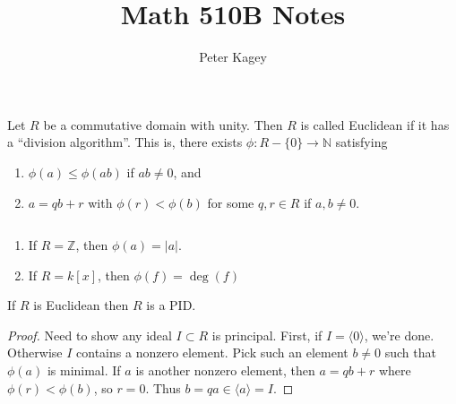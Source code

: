 \documentclass{article}
\newenvironment{definition}[1][Definition.]{
  \begin{trivlist} \item[\hskip \labelsep {\bfseries #1}]
}{\end{trivlist}}
\newenvironment{example}[1][Example.]{
  \begin{trivlist} \item[\hskip \labelsep {\bfseries #1}]
}{\end{trivlist}}
\newenvironment{theorem}[1][Theorem.]{
  \begin{trivlist} \item[\hskip \labelsep {\bfseries #1}]
}{\end{trivlist}}
\newcommand{\set}[1]{\{ #1 \}}
\newcommand{\ang}[1]{\langle #1 \rangle}
\newcommand{\fn}[3]{#1 \colon #2 \rightarrow #3}
\begin{document}
\title{Math 510B Notes}
\author{Peter Kagey}

\maketitle

\begin{definition}
  Let $R$ be a commutative domain with unity. Then $R$ is called Euclidean if it
  has a ``division algorithm''. This is, there exists
  $\fn{\phi}{R - \set 0}{\mathbb N}$ satisfying \begin{enumerate}
    \item $\phi(a) \leq \phi(ab)$ if $ab \neq 0$, and
    \item $a = qb + r$ with $\phi(r) < \phi(b)$ for some $q, r \in R$ if $a, b \neq 0$.
  \end{enumerate}
\end{definition}

\begin{example}[Examples.] $ $
  \begin{enumerate}
    \item If $R = \mathbb Z$, then $\phi(a) = |a|$.
    \item If $R = k[x]$, then $\phi(f) = \deg(f)$
  \end{enumerate}
\end{example}

\begin{theorem}[Lemma.]
  If $R$ is Euclidean then $R$ is a PID.
\end{theorem}
\begin{proof}
  Need to show any ideal $I \subset R$ is principal.
  First, if $I = \ang 0$, we're done. Otherwise $I$ contains a nonzero element.
  Pick such an element $b \neq 0$ such that $\phi(a)$ is minimal. If $a$ is
  another nonzero element, then $a = qb + r$ where $\phi(r) < \phi(b)$, so
  $r = 0$. Thus $b = qa \in \ang a = I$.
\end{proof}
\end{document}
